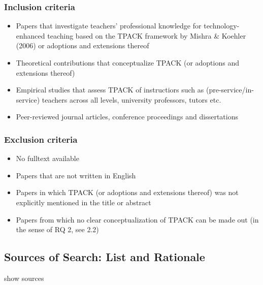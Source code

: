 \documentclass[
]{article}
\begin{document}
\hypertarget{inclusion-criteria}{%
\subsubsection{Inclusion criteria}\label{inclusion-criteria}}

\begin{itemize}
\item
  Papers that investigate teachers' professional knowledge for
  technology-enhanced teaching based on the TPACK framework by Mishra \&
  Koehler (2006) or adoptions and extensions thereof
\item
  Theoretical contributions that conceptualize TPACK (or adoptions and
  extensions thereof)
\item
  Empirical studies that assess TPACK of instructiors such as
  (pre-service/in-service) teachers across all levels, university
  professors, tutors etc.
\item
  Peer-reviewed journal articles, conference proceedings and
  dissertations
\end{itemize}

\hypertarget{exclusion-criteria}{%
\subsubsection{Exclusion criteria}\label{exclusion-criteria}}

\begin{itemize}
\item
  No fulltext available
\item
  Papers that are not written in English
\item
  Papers in which TPACK (or adoptions and extensions thereof) was not
  explicitly mentioned in the title or abstract
\item
  Papers from which no clear conceptualization of TPACK can be made out
  (in the sense of RQ 2, see 2.2)
\end{itemize}

\hypertarget{sources-of-search-list-and-rationale}{%
\subsection{Sources of Search: List and
Rationale}\label{sources-of-search-list-and-rationale}}

show sources
\end{document}
